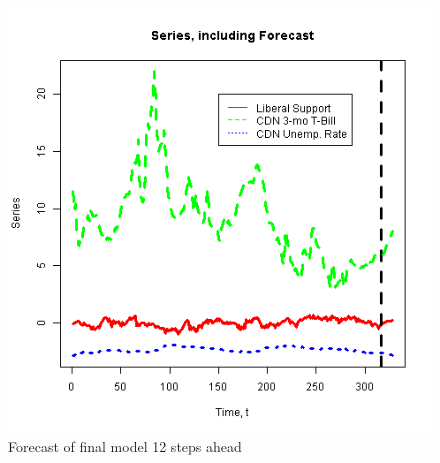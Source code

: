 \documentclass[article]{jss}
\begin{document}
%



\begin{figure}[H]
  \centering
  \includegraphics[scale = 1, keepaspectratio=true]{Figures/forecast_vars.png}
  \caption{Forecast of final model 12 steps ahead}
  \label{fig:forecast_vars}
\end{figure}
\end{document}
